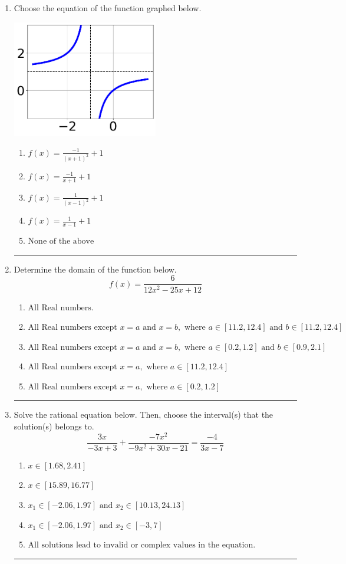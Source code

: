 \documentclass[14pt]{extbook}
\newcommand{\litem}[1]{\item#1\hspace*{-1cm}\rule{\textwidth}{0.4pt}}
\begin{document}
\begin{enumerate}
{\begin{enumerate}[label=\Alph*.]
\end{enumerate} }
\litem{
Choose the equation of the function graphed below.
\begin{center}
    \includegraphics[width=0.5\textwidth]{../Figures/rationalGraphToEquationC.png}
\end{center}
\begin{enumerate}[label=\Alph*.]
\item \( f(x) = \frac{-1}{(x + 1)^2} + 1 \)
\item \( f(x) = \frac{-1}{x + 1} + 1 \)
\item \( f(x) = \frac{1}{(x - 1)^2} + 1 \)
\item \( f(x) = \frac{1}{x - 1} + 1 \)
\item \( \text{None of the above} \)

\end{enumerate} }
\litem{
Determine the domain of the function below.\[ f(x) = \frac{6}{12x^{2} -25 x + 12} \]\begin{enumerate}[label=\Alph*.]
\item \( \text{All Real numbers.} \)
\item \( \text{All Real numbers except } x = a \text{ and } x = b, \text{ where } a \in [11.2, 12.4] \text{ and } b \in [11.2, 12.4] \)
\item \( \text{All Real numbers except } x = a \text{ and } x = b, \text{ where } a \in [0.2, 1.2] \text{ and } b \in [0.9, 2.1] \)
\item \( \text{All Real numbers except } x = a, \text{ where } a \in [11.2, 12.4] \)
\item \( \text{All Real numbers except } x = a, \text{ where } a \in [0.2, 1.2] \)

\end{enumerate} }
\litem{
Solve the rational equation below. Then, choose the interval(s) that the solution(s) belongs to.\[ \frac{3x}{-3x + 3} + \frac{-7x^{2}}{-9x^{2} +30 x -21} = \frac{-4}{3x -7} \]\begin{enumerate}[label=\Alph*.]
\item \( x \in [1.68,2.41] \)
\item \( x \in [15.89,16.77] \)
\item \( x_1 \in [-2.06, 1.97] \text{ and } x_2 \in [10.13,24.13] \)
\item \( x_1 \in [-2.06, 1.97] \text{ and } x_2 \in [-3,7] \)
\item \( \text{All solutions lead to invalid or complex values in the equation.} \)


\end{enumerate}}
\end{enumerate}
\end{document}
